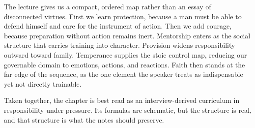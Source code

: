The lecture gives us a compact, ordered map rather than an essay of disconnected virtues. First we learn protection, because a man must be able to defend himself and care for the instrument of action. Then we add courage, because preparation without action remains inert. Mentorship enters as the social structure that carries training into character. Provision widens responsibility outward toward family. Temperance supplies the stoic control map, reducing our governable domain to emotions, actions, and reactions. Faith then stands at the far edge of the sequence, as the one element the speaker treats as indispensable yet not directly trainable.

Taken together, the chapter is best read as an interview-derived curriculum in responsibility under pressure. Its formulas are schematic, but the structure is real, and that structure is what the notes should preserve.